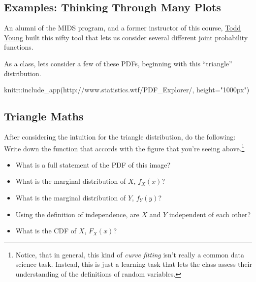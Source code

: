 \documentclass[
]{book}
\newenvironment{Shaded}{\begin{snugshade}}{\end{snugshade}}
\newcommand{\AttributeTok}[1]{\textcolor[rgb]{0.77,0.63,0.00}{#1}}
\newcommand{\FunctionTok}[1]{\textcolor[rgb]{0.00,0.00,0.00}{#1}}
\newcommand{\NormalTok}[1]{#1}
\newcommand{\SpecialCharTok}[1]{\textcolor[rgb]{0.00,0.00,0.00}{#1}}
\newcommand{\StringTok}[1]{\textcolor[rgb]{0.31,0.60,0.02}{#1}}
\providecommand{\tightlist}{%
  \setlength{\itemsep}{0pt}\setlength{\parskip}{0pt}}
\theoremstyle{definition}
\theoremstyle{definition}
\theoremstyle{definition}
\theoremstyle{definition}
\theoremstyle{remark}
\begin{document}
\hypertarget{examples-thinking-through-many-plots}{%
\subsection{Examples: Thinking Through Many Plots}\label{examples-thinking-through-many-plots}}

An alumni of the MIDS program, and a former instructor of this course, \href{https://www.linkedin.com/in/dtoddyoung/}{Todd Young} built this nifty tool that lets us consider several different joint probability functions.

As a class, lets consider a few of these PDFs, beginning with this ``triangle'' distribution.

\begin{Shaded}
\begin{Highlighting}[]
\NormalTok{knitr}\SpecialCharTok{::}\FunctionTok{include\_app}\NormalTok{(}\StringTok{\textquotesingle{}http://www.statistics.wtf/PDF\_Explorer/\textquotesingle{}}\NormalTok{, }\AttributeTok{height=}\StringTok{"1000px"}\NormalTok{)}
\end{Highlighting}
\end{Shaded}

\hypertarget{triangle-maths}{%
\subsection{Triangle Maths}\label{triangle-maths}}

After considering the intuition for the triangle distribution, do the following: Write down the function that accords with the figure that you're seeing above.\footnote{Notice, that in general, this kind of \emph{curve fitting} isn't really a common data science task. Instead, this is just a learning task that lets the class assess their understanding of the definitions of random variables.}

\begin{itemize}
\tightlist
\item
  What is a full statement of the PDF of this image?
\item
  What is the marginal distribution of \(X\), \(f_{X}(x)\)?
\item
  What is the marginal distribution of \(Y\), \(f_{Y}(y)\)?
\item
  Using the definition of independence, are \(X\) and \(Y\) independent of each other?
\item
  What is the CDF of \(X\), \(F_{X}(x)\)?
\end{itemize}
\end{document}
